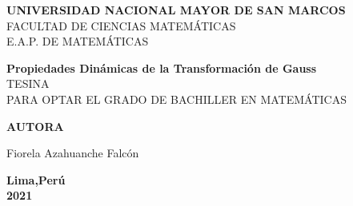 \documentclass[12pt]{report}
\begin{document}

\begin{titlepage}
 
\begin{center}
 
 {\large \bf UNIVERSIDAD NACIONAL MAYOR DE SAN MARCOS}\\
 
{\large FACULTAD DE CIENCIAS MATEMÁTICAS}\\{\large E.A.P. DE MATEMÁTICAS}\\[2.0cm]



\vspace{1cm}
\title{} %
{\bf \Large Propiedades Dinámicas de la Transformación de Gauss }\\[1.5cm] %

{TESINA}\\[0.5cm]
{PARA OPTAR EL GRADO DE BACHILLER EN MATEMÁTICAS}\\[1.5cm]
 
\vspace{2cm} 

        
        {\large \textbf{ AUTORA }}\\
        
        \vspace{5mm}
        
        {\Large Fiorela Azahuanche Falcón}
        
        \vspace{50mm}
        
        
        
        {\Large \textbf{ Lima,Perú }}\\
        
        \vspace{3mm}
        {\Huge \textbf{2021}}
\end{center}

\end{titlepage}
\end{document}
